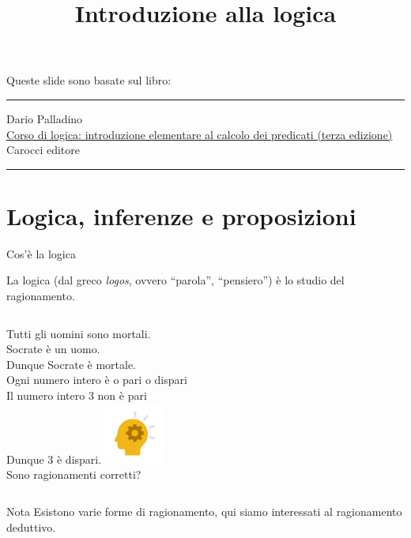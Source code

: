 \documentclass[aspectratio=169,10pt,dvipsnames,handout]{beamer}
\title{Introduzione alla logica}
\begin{document}
\begin{frame}
	\titlepage
\end{frame}

\begin{frame}{}
	Queste slide sono basate sul libro:
	\bigskip

	\hrule
	\medskip
	Dario Palladino\\
	\textcolor{blue}{\href{https://www.carocci.it/prodotto/corso-di-logica-3}{Corso di logica: introduzione elementare al calcolo dei predicati (terza edizione)}}\\
	Carocci editore\\
	\hrule

	\bigskip
	\centering
\end{frame}


\section{Logica, inferenze e proposizioni}

\begin{frame}{Cos'è la logica}
	\begin{definition}[Logica]
		La \alert{logica} (dal greco \textit{logos}, ovvero ``parola'', ``pensiero'') è lo studio del ragionamento.
	\end{definition}
	\begin{example}
		\begin{columns}
			\centering

			Tutti gli uomini sono mortali.\\
			Socrate è un uomo.\\
			Dunque Socrate è mortale.\\[0.6cm]
			Ogni numero intero è o pari o dispari\\
			Il numero intero 3 non è pari\\
			Dunque 3 è dispari.
			\centering
			\includegraphics[width=2cm,keepaspectratio]{logica.png}\\
			\alert{Sono ragionamenti corretti?}
		\end{columns}
	\end{example}
	\begin{block}{Nota}
		Esistono varie forme di ragionamento, qui siamo interessati al \alert{ragionamento deduttivo}.
	\end{block}
\end{frame}
\end{document}

